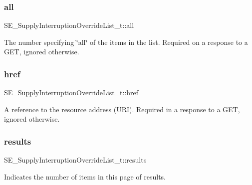 \subsubsection{\texorpdfstring{all}{all}}
{\footnotesize\ttfamily S\+E\+\_\+\+Supply\+Interruption\+Override\+List\+\_\+t\+::all}

The number specifying \char`\"{}all\char`\"{} of the items in the list. Required on a response to a G\+ET, ignored otherwise. \mbox{\label{group__SupplyInterruptionOverrideList_gad15eb8acad90ef62beb20d8dff40fc29}} 
\subsubsection{\texorpdfstring{href}{href}}
{\footnotesize\ttfamily S\+E\+\_\+\+Supply\+Interruption\+Override\+List\+\_\+t\+::href}

A reference to the resource address (U\+RI). Required in a response to a G\+ET, ignored otherwise. \mbox{\label{group__SupplyInterruptionOverrideList_gad45b841730b071b050986cae31535380}} 
\subsubsection{\texorpdfstring{results}{results}}
{\footnotesize\ttfamily S\+E\+\_\+\+Supply\+Interruption\+Override\+List\+\_\+t\+::results}

Indicates the number of items in this page of results. 